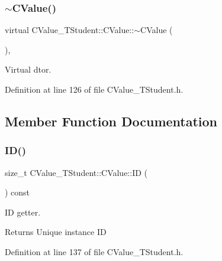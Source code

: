 \subsubsection{\texorpdfstring{$\sim$\+C\+Value()}{~CValue()}}
{\footnotesize\ttfamily virtual C\+Value\+\_\+\+T\+Student\+::\+C\+Value\+::$\sim$\+C\+Value (\begin{DoxyParamCaption}{ }\end{DoxyParamCaption})\hspace{0.3cm}{\ttfamily [inline]}, {\ttfamily [virtual]}}



Virtual d\textquotesingle{}tor. 



Definition at line 126 of file C\+Value\+\_\+\+T\+Student.\+h.



\subsection{Member Function Documentation}
\mbox{\label{class_c_value___t_student_1_1_c_value_a1566b665478e871559c8258c95903756}} 
\subsubsection{\texorpdfstring{I\+D()}{ID()}}
{\footnotesize\ttfamily size\+\_\+t C\+Value\+\_\+\+T\+Student\+::\+C\+Value\+::\+ID (\begin{DoxyParamCaption}{ }\end{DoxyParamCaption}) const\hspace{0.3cm}{\ttfamily [inline]}}



ID getter. 

\begin{DoxyReturn}{Returns}
Unique instance ID 
\end{DoxyReturn}


Definition at line 137 of file C\+Value\+\_\+\+T\+Student.\+h.

\mbox{\label{class_c_value___t_student_1_1_c_value_a8c4c7ec16e82c22d526efe356a043361}} 
